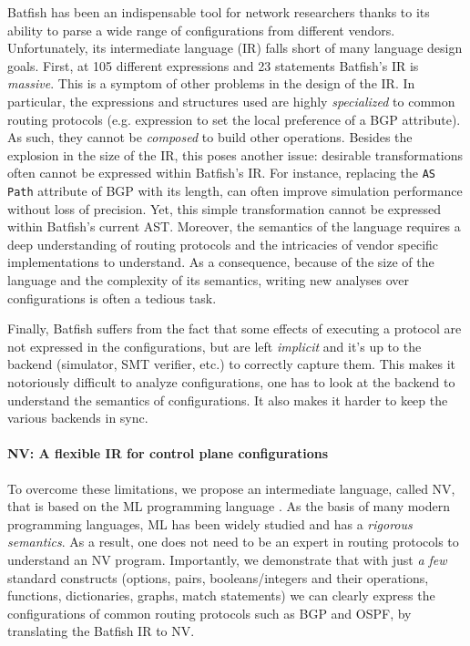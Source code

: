 \documentclass[sigconf,10pt]{acmart}
\begin{document}
Batfish has been an indispensable tool for network researchers thanks
to its ability to parse a wide range of configurations from different
vendors. Unfortunately, its intermediate language (IR) falls short of
many language design goals. First, at 105 different expressions and 23
statements Batfish's IR is \emph{massive}. This is a symptom of other
problems in the design of the IR. In particular, the expressions and
structures used are highly \emph{specialized} to common routing
protocols (e.g. expression to set the local preference of a BGP
attribute). As such, they cannot be \emph{composed} to build other
operations. Besides the explosion in the size of the IR, this poses
another issue: desirable transformations often cannot be expressed
within Batfish's IR. For instance, replacing the \texttt{AS Path}
attribute of BGP with its length, can often improve simulation
performance without loss of precision. Yet, this simple transformation
cannot be expressed within Batfish's current AST.  Moreover, the
semantics of the language requires a deep understanding of routing
protocols and the intricacies of vendor specific implementations to
understand. As a consequence, because of the size of the language and
the complexity of its semantics, writing new analyses over
configurations is often a tedious task.

Finally, Batfish suffers from the fact that some effects of executing
a protocol are not expressed in the configurations, but are left
\emph{implicit} and it's up to the backend (simulator, SMT verifier,
etc.) to correctly capture them. This makes it notoriously difficult
to analyze configurations, one has to look at the backend to
understand the semantics of configurations. It also makes it harder to
keep the various backends in sync.

\paragraph{NV: A flexible IR for control plane configurations}

To overcome these limitations, we propose an intermediate language,
called NV, that is based on the ML programming language
\cite{milner1978theory}. As the basis of many modern programming
languages, ML has been widely studied and has a \emph{rigorous
  semantics}. As a result, one does not need to be an expert in
routing protocols to understand an NV program. Importantly, we
demonstrate that with just \emph{a few} standard constructs (options,
pairs, booleans/integers and their operations, functions,
dictionaries, graphs, match statements) we can clearly express the
configurations of common routing protocols such as BGP and OSPF, by
translating the Batfish IR to NV.
\end{document}
